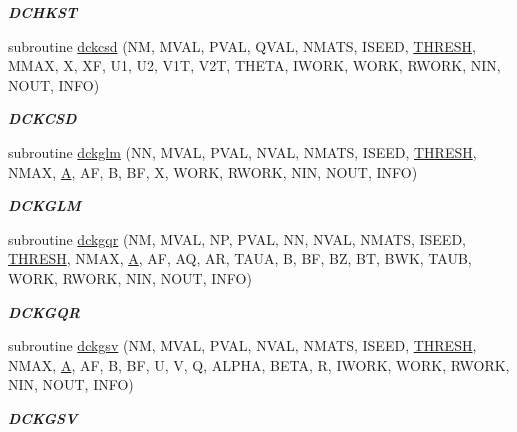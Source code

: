 \begin{DoxyCompactItemize}
\begin{DoxyCompactList}\small\item\em {\bfseries D\+C\+H\+K\+S\+T} \end{DoxyCompactList}\item 
subroutine \hyperlink{group__double__eig_ga21bc4aa635925a1753872278c38891b8}{dckcsd} (N\+M, M\+V\+A\+L, P\+V\+A\+L, Q\+V\+A\+L, N\+M\+A\+T\+S, I\+S\+E\+E\+D, \hyperlink{zlaqgs_8c_a0656018abfc9fa2821827415f5d5ea57}{T\+H\+R\+E\+S\+H}, M\+M\+A\+X, X, X\+F, U1, U2, V1\+T, V2\+T, T\+H\+E\+T\+A, I\+W\+O\+R\+K, W\+O\+R\+K, R\+W\+O\+R\+K, N\+I\+N, N\+O\+U\+T, I\+N\+F\+O)
\begin{DoxyCompactList}\small\item\em {\bfseries D\+C\+K\+C\+S\+D} \end{DoxyCompactList}\item 
subroutine \hyperlink{group__double__eig_gaf6b8c9f14788fd8526a77c40a11e684f}{dckglm} (N\+N, M\+V\+A\+L, P\+V\+A\+L, N\+V\+A\+L, N\+M\+A\+T\+S, I\+S\+E\+E\+D, \hyperlink{zlaqgs_8c_a0656018abfc9fa2821827415f5d5ea57}{T\+H\+R\+E\+S\+H}, N\+M\+A\+X, \hyperlink{classA}{A}, A\+F, B, B\+F, X, W\+O\+R\+K, R\+W\+O\+R\+K, N\+I\+N, N\+O\+U\+T, I\+N\+F\+O)
\begin{DoxyCompactList}\small\item\em {\bfseries D\+C\+K\+G\+L\+M} \end{DoxyCompactList}\item 
subroutine \hyperlink{group__double__eig_ga2d542e25f93c07e7fac6bdf79e741bac}{dckgqr} (N\+M, M\+V\+A\+L, N\+P, P\+V\+A\+L, N\+N, N\+V\+A\+L, N\+M\+A\+T\+S, I\+S\+E\+E\+D, \hyperlink{zlaqgs_8c_a0656018abfc9fa2821827415f5d5ea57}{T\+H\+R\+E\+S\+H}, N\+M\+A\+X, \hyperlink{classA}{A}, A\+F, A\+Q, A\+R, T\+A\+U\+A, B, B\+F, B\+Z, B\+T, B\+W\+K, T\+A\+U\+B, W\+O\+R\+K, R\+W\+O\+R\+K, N\+I\+N, N\+O\+U\+T, I\+N\+F\+O)
\begin{DoxyCompactList}\small\item\em {\bfseries D\+C\+K\+G\+Q\+R} \end{DoxyCompactList}\item 
subroutine \hyperlink{group__double__eig_gafbc45ea9306629ad531d876544d73adf}{dckgsv} (N\+M, M\+V\+A\+L, P\+V\+A\+L, N\+V\+A\+L, N\+M\+A\+T\+S, I\+S\+E\+E\+D, \hyperlink{zlaqgs_8c_a0656018abfc9fa2821827415f5d5ea57}{T\+H\+R\+E\+S\+H}, N\+M\+A\+X, \hyperlink{classA}{A}, A\+F, B, B\+F, U, V, Q, A\+L\+P\+H\+A, B\+E\+T\+A, R, I\+W\+O\+R\+K, W\+O\+R\+K, R\+W\+O\+R\+K, N\+I\+N, N\+O\+U\+T, I\+N\+F\+O)
\begin{DoxyCompactList}\small\item\em {\bfseries D\+C\+K\+G\+S\+V} \end{DoxyCompactList}\item 

\end{DoxyCompactItemize}
